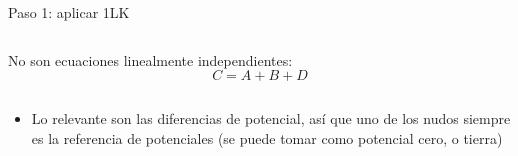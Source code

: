 \documentclass[aspectratio=169, xcolor={usenames,svgnames,dvipsnames}]{beamer}
\begin{document}
\begin{frame}{Paso 1: aplicar 1LK}
\begin{columns}
\begin{column}{0.53\columnwidth}
    No son ecuaciones linealmente independientes:
    \begin{equation*}
      C = A + B + D
    \end{equation*}
    \end{column}
    \end{columns}
    
    \vspace{5pt}   
    
    \begin{center}
    \end{center}
    \vspace{-10pt} 
    \begin{itemize}\addtolength{\itemindent}{7mm}
        \item Lo relevante son las \alert{diferencias de potencial}, así que uno de los nudos siempre \hspace*{7mm}es la referencia de potenciales (se puede tomar como potencial cero, o tierra)
    \end{itemize}
\end{frame}

\end{document}
